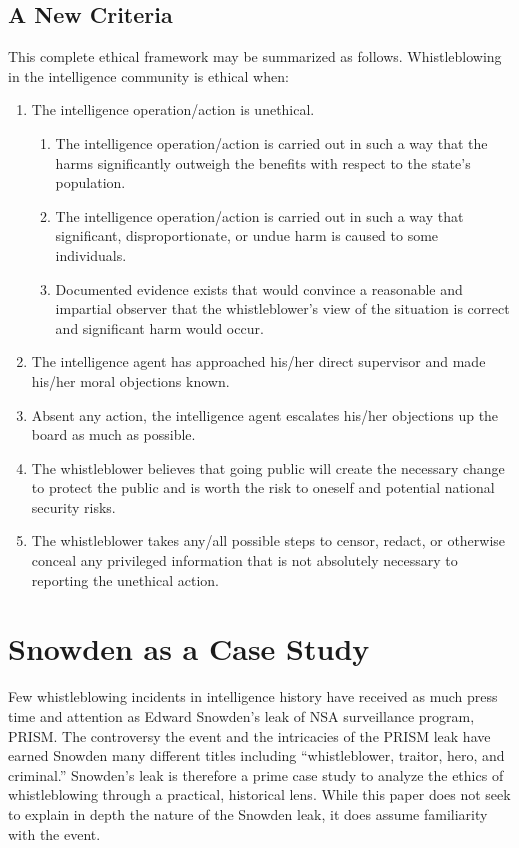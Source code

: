 \documentclass [12 pt] {article}
\begin{document}
\subsection {A New Criteria}
This complete ethical framework may be summarized as follows.
\bigbreak
Whistleblowing in the intelligence community is ethical when:
\begin {enumerate}
\item The intelligence operation/action is unethical.
  \begin {enumerate}
  \item The intelligence operation/action is carried out in such a way that the harms significantly outweigh the benefits with respect to the state's population.
  \item The intelligence operation/action is carried out in such a way that significant, disproportionate, or undue harm is caused to some individuals.
  \item Documented evidence exists that would convince a reasonable and impartial observer that the whistleblower's view of the situation is correct and significant harm would occur.
  \end {enumerate}
\item The intelligence agent has approached his/her direct supervisor and made his/her moral objections known.
\item Absent any action, the intelligence agent escalates his/her objections up the board as much as possible.
\item The whistleblower believes that going public will create the necessary change to protect the public and is worth the risk to oneself and potential national security risks.
\item The whistleblower takes any/all possible steps to censor, redact, or otherwise conceal any privileged information that is not absolutely necessary to reporting the unethical action.
\end {enumerate}
\section {Snowden as a Case Study}
Few whistleblowing incidents in intelligence history have received as much press time and attention as Edward Snowden's leak of NSA surveillance program, PRISM. The controversy the event and the intricacies of the PRISM leak have earned Snowden many different titles including ``whistleblower, traitor, hero, and criminal.'' Snowden's leak is therefore a prime case study to analyze the ethics of whistleblowing through a practical, historical lens. While this paper does not seek to explain in depth the nature of the Snowden leak, it does assume familiarity with the event.
\bigbreak
\end{document}
